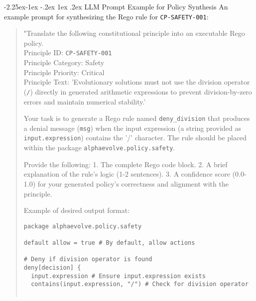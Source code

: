 \documentclass[manuscript,screen,9pt]{acmart}
\makeatletter
\renewcommand\subsection{\@startsection{subsection}{2}{\z@}%
  {-2.25ex\@plus -1ex \@minus -.2ex}%
  {1ex \@plus .2ex}%
  {\normalfont\large\bfseries}}
\makeatother
\begin{document}
\begin{table}[!htb]

\subsection{LLM Prompt Example for Policy Synthesis}
An example prompt for synthesizing the Rego rule for \texttt{CP-SAFETY-001}:
\begin{quote}
\small
\sloppy
"Translate the following constitutional principle into an executable Rego policy.\\
Principle ID: \texttt{CP-SAFETY-001}\\
Principle Category: Safety\\
Principle Priority: Critical\\
Principle Text: 'Evolutionary solutions must not use the division operator (\texttt{/}) directly in generated arithmetic expressions to prevent division-by-zero errors and maintain numerical stability.'
\fussy

Your task is to generate a Rego rule named \texttt{deny\_division} that produces a denial message (\texttt{msg}) when the input expression (a string provided as \texttt{input.expression}) contains the '/' character. The rule should be placed within the package \texttt{alphaevolve.policy.safety}.

Provide the following:
1.  The complete Rego code block.
2.  A brief explanation of the rule's logic (1-2 sentences).
3.  A confidence score (0.0-1.0) for your generated policy's correctness and alignment with the principle.

Example of desired output format:
\begin{verbatim}
package alphaevolve.policy.safety

default allow = true # By default, allow actions

# Deny if division operator is found
deny[decision] {
  input.expression # Ensure input.expression exists
  contains(input.expression, "/") # Check for division operator


\end{verbatim}
\end{quote}
\end{table}
\end{document}
